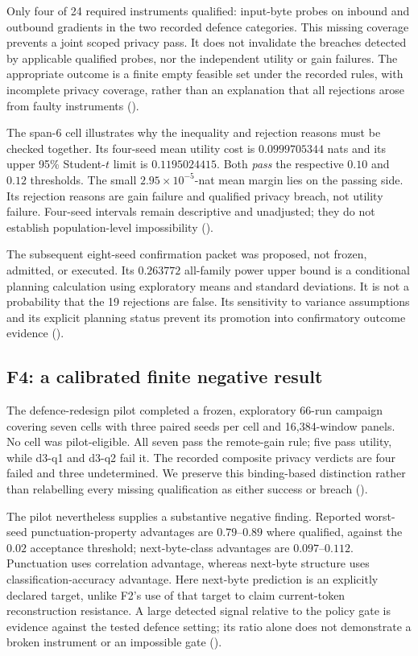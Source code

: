 Only four of 24 required instruments qualified: input-byte probes on
inbound and outbound gradients in the two recorded defence categories.
This missing coverage prevents a joint scoped privacy pass. It does not
invalidate the breaches detected by applicable qualified probes, nor the
independent utility or gain failures. The appropriate outcome is a finite
empty feasible set under the recorded rules, with incomplete privacy
coverage, rather than an explanation that all rejections arose from faulty
instruments ().

The span-6 cell illustrates why the inequality and rejection reasons must
be checked together. Its four-seed mean utility cost is
$0.0999705344$ nats and its upper 95\% Student-$t$ limit is
$0.1195024415$. Both \emph{pass} the respective $0.10$ and $0.12$
thresholds. The small $2.95\times10^{-5}$-nat mean margin lies on the
passing side. Its rejection reasons are gain failure and qualified privacy
breach, not utility failure. Four-seed intervals remain descriptive and
unadjusted; they do not establish population-level impossibility
().

The subsequent eight-seed confirmation packet was proposed, not frozen,
admitted, or executed. Its $0.263772$ all-family power upper bound is a
conditional planning calculation using exploratory means and standard
deviations. It is not a probability that the 19 rejections are false.
Its sensitivity to variance assumptions and its explicit planning status
prevent its promotion into confirmatory outcome evidence ().

\subsection{F4: a calibrated finite negative result}
\label{sec:f4}

The defence-redesign pilot completed a frozen, exploratory 66-run campaign
covering seven cells with three paired seeds per cell and 16,384-window
panels. No cell was pilot-eligible. All seven pass the remote-gain rule;
five pass utility, while d3-q1 and d3-q2 fail it. The recorded composite
privacy verdicts are four failed and three undetermined. We preserve this
binding-based distinction rather than relabelling every missing
qualification as either success or breach ().

The pilot nevertheless supplies a substantive negative finding. Reported
worst-seed punctuation-property advantages are $0.79$--$0.89$ where
qualified, against the $0.02$ acceptance threshold; next-byte-class
advantages are $0.097$--$0.112$. Punctuation uses correlation advantage,
whereas next-byte structure uses classification-accuracy advantage.
Here next-byte prediction is an explicitly declared target, unlike F2's
use of that target to claim current-token reconstruction resistance.
A large detected signal relative to the policy gate is evidence against
the tested defence setting; its ratio alone does not demonstrate a broken
instrument or an impossible gate ().

